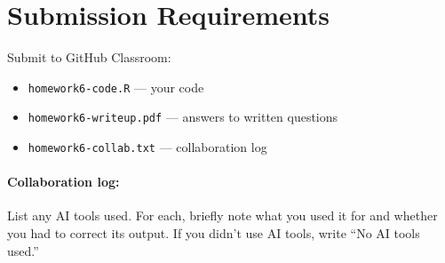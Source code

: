 \documentclass[11pt]{article}
\begin{document}
\section*{Submission Requirements}

Submit to GitHub Classroom:
\begin{itemize}
    \item \texttt{homework6-code.R} --- your code
    \item \texttt{homework6-writeup.pdf} --- answers to written questions
    \item \texttt{homework6-collab.txt} --- collaboration log
\end{itemize}

\paragraph{Collaboration log:} List any AI tools used. For each, briefly note what you used it for and whether you had to correct its output. If you didn't use AI tools, write ``No AI tools used.''
\end{document}
